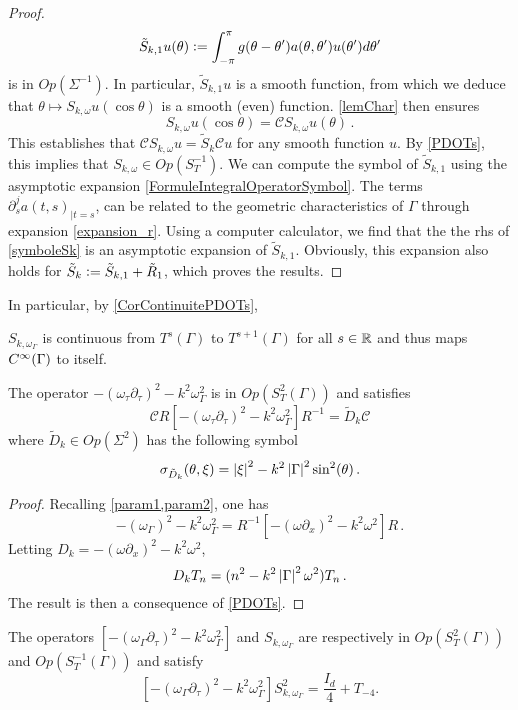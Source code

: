 \documentclass[a4paper]{article}
\begin{document}
\begin{proof}
	\[\tilde{S}_{k,1} u(\theta) \mathrel{\mathop:}= \int_{-\pi}^\pi g(\theta-\theta') a(\theta,\theta')u(\theta')d\theta'\]
	is in $\textit{Op}(\Sigma^{-1})$. In particular, $\tilde{S}_{k,1}u$ is a smooth function, from which we deduce that $\theta \mapsto S_{k,\omega}u(\cos\theta)$ is a smooth (even) function. \autoref{lemChar} then ensures 
	\[S_{k,\omega}u(\cos\theta) = \mathcal{C} S_{k,\omega}u(\theta)\,.\] 
	This establishes that $\mathcal{C} S_{k,\omega}u = \tilde{S}_k \mathcal{C}u$ for any smooth function $u$. By \autoref{PDOTs}, this implies that $S_{k,\omega} \in \textit{Op}\left(S_T^{-1}\right)$. We can compute the symbol of $\tilde{S}_{k,1}$ using the asymptotic expansion \eqref{FormuleIntegralOperatorSymbol}. The terms $\partial_s^ja(t,s)_{|t=s}$, can be related to the geometric characteristics of $\Gamma$ through expansion \eqref{expansion_r}. Using a computer calculator, we find that the the rhs of \eqref{symboleSk} is an asymptotic expansion of $\tilde{S}_{k,1}$. Obviously, this expansion also holds for $\tilde{S}_k \mathrel{\mathop:}= \tilde{S}_{k,1} + \tilde{R}_1$, which proves the results.
\end{proof}
\noindent In particular, by \autoref{CorContinuitePDOTs},
\begin{Cor}
	$S_{k,\omega_\Gamma}$ is continuous from $T^s(\Gamma)$ to $T^{s+1}(\Gamma)$ for all $s\in \mathbb{R}$ and thus maps $C^{\infty}(\Gamma)$ to itself. 
\end{Cor}
\begin{Lem}
	\label{LemsymbolDk}
	The operator $-(\omega_\tau \partial_\tau)^2 - k^2 \omega_\Gamma^2$ is in $\textit{Op}(S_{T}^2(\Gamma))$ and satisfies 
	\[\mathcal{C}R\left[-(\omega_\tau \partial_\tau)^2 - k^2 \omega_\Gamma^2\right]R^{-1} = \tilde{D}_k\mathcal{C}\] 
	where $\tilde{D}_k \in \textit{Op}(\Sigma^2)$ has the following symbol
	\begin{equation}
		\sigma_{\tilde{D}_k}(\theta,\xi) = \left\lvert \xi \right\rvert^2 - k^2 \left\lvert \Gamma \right\rvert^2 \sin^2(\theta)\,.
		\label{symbolDk}
	\end{equation}
\end{Lem}
\begin{proof}
	Recalling \cref{param1,param2}, one has 
	\[-(\omega_\Gamma)^2 - k^2 \omega_\Gamma^2 = R^{-1} \left[-(\omega \partial_x)^2 - k^2 \omega^2\right]R\,.\]
	Letting $D_k = -(\omega \partial_x)^2 - k^2 \omega^2$,
	\[D_k T_n = (n^2 - k^2\left\lvert \Gamma \right\rvert^2\omega^2)T_n\,.\]
	The result is then a consequence of \autoref{PDOTs}.
\end{proof}
\begin{The}
	\label{TheSkomega}
	The operators $\left[-(\omega_\Gamma \partial_\tau)^2 - k^2\omega_\Gamma^2\right]$ and  $S_{k,\omega_\Gamma}$ are respectively in $\textit{Op}(S^{2}_T(\Gamma))$ and $\textit{Op}(S^{-1}_T(\Gamma))$ and satisfy
	\[\left[-(\omega_\Gamma \partial_\tau)^2 - k^2\omega_\Gamma^2\right] S_{k,\omega_\Gamma}^2 = \frac{I_d}{4} + T_{-4}.\]
\end{The}
\end{document}
